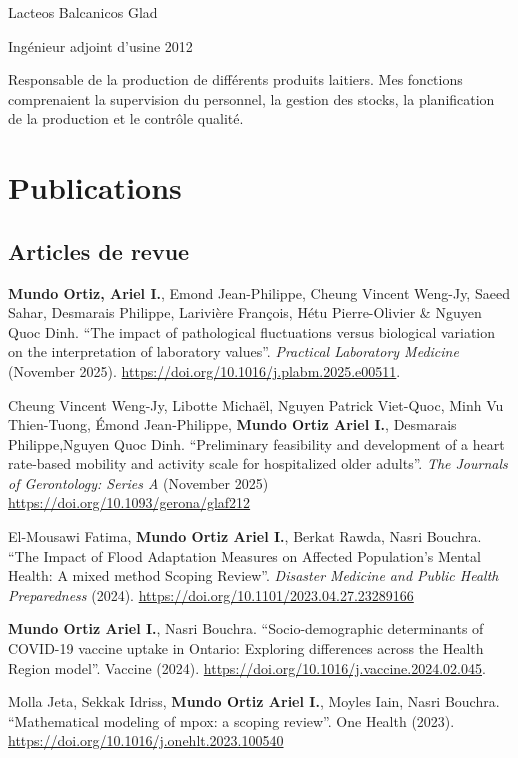 \documentclass[10pt,]{article}
\providecommand{\tightlist}{%
  \setlength{\itemsep}{0pt}\setlength{\parskip}{0pt}}
\renewenvironment{itemize}{
  \begin{list}{}{
    \setlength{\leftmargin}{1.5em}
  }
}{
  \end{list}
}
\begin{document}
Lacteos Balcanicos Glad

Ingénieur adjoint d'usine \hfill 2012

\begin{itemize}
\tightlist
\item
  Responsable de la production de différents produits laitiers. Mes
  fonctions comprenaient la supervision du personnel, la gestion des
  stocks, la planification de la production et le contrôle qualité.
\end{itemize}

\section{Publications}\label{publications}

\subsection{Articles de revue}\label{articles-de-revue}

\textbf{Mundo Ortiz, Ariel I.}, Emond Jean-Philippe, Cheung Vincent
Weng-Jy, Saeed Sahar, Desmarais Philippe, Larivière François, Hétu
Pierre-Olivier \& Nguyen Quoc Dinh. ``The impact of pathological
fluctuations versus biological variation on the interpretation of
laboratory values''. \emph{Practical Laboratory Medicine} (November
2025). \url{https://doi.org/10.1016/j.plabm.2025.e00511}.

Cheung Vincent Weng-Jy, Libotte Michaël, Nguyen Patrick Viet-Quoc, Minh
Vu Thien-Tuong, Émond Jean-Philippe, \textbf{Mundo Ortiz Ariel I.},
Desmarais Philippe,Nguyen Quoc Dinh. ``Preliminary feasibility and
development of a heart rate-based mobility and activity scale for
hospitalized older adults''. \emph{The Journals of Gerontology: Series
A} (November 2025) \url{https://doi.org/10.1093/gerona/glaf212}

El-Mousawi Fatima, \textbf{Mundo Ortiz Ariel I.}, Berkat Rawda, Nasri
Bouchra. ``The Impact of Flood Adaptation Measures on Affected
Population's Mental Health: A mixed method Scoping Review''.
\emph{Disaster Medicine and Public Health Preparedness} (2024).
\url{https://doi.org/10.1101/2023.04.27.23289166}

\textbf{Mundo Ortiz Ariel I.}, Nasri Bouchra. ``Socio-demographic
determinants of COVID-19 vaccine uptake in Ontario: Exploring
differences across the Health Region model''. Vaccine (2024).
\url{https://doi.org/10.1016/j.vaccine.2024.02.045}.

Molla Jeta, Sekkak Idriss, \textbf{Mundo Ortiz Ariel I.}, Moyles Iain,
Nasri Bouchra. ``Mathematical modeling of mpox: a scoping review''. One
Health (2023). \url{https://doi.org/10.1016/j.onehlt.2023.100540}
\end{document}
